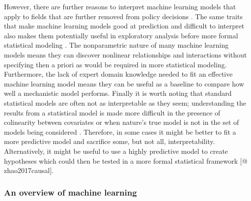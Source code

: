 \documentclass[10pt,]{article}
\begin{document}
However, there are further reasons to interpret machine learning models that apply to fields that are further removed from policy decisions \citep{elith2009species}. The same traits that make machine learning models good at prediction and difficult to interpret also makes them potentially useful in exploratory analysis before more formal statistical modeling \citep{zhao2017causal}. The nonparametric nature of many machine learning models means they can discover nonlinear relationships and interactions without specifying then a priori as would be required in more statistical modeling. Furthermore, the lack of expert domain knowledge needed to fit an effective machine learning model means they can be useful as a baseline to compare how well a mechanistic model performs. Finally it is worth noting that standard statistical models are often not as interpretable as they seem; understanding the results from a statistical model is made more difficult in the presence of colinearity between covariates or when nature's true model is not in the set of models being considered \citep{lyddon2018nonparametric, yao2017using}. Therefore, in some cases it might be better to fit a more predictive model and sacrifice some, but not all, interpretability. Alternatively, it might be useful to use a highly predictive model to create hypotheses which could then be tested in a more formal statistical framework {[}@ zhao2017causal{]}.

\subsubsection{An overview of machine learning}\label{an-overview-of-machine-learning}
\end{document}
